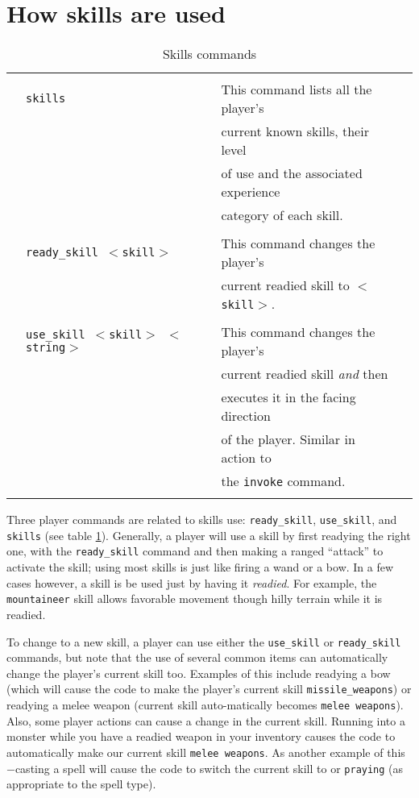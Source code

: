 \section{How skills are used}
 
\begin{table}
\small
\caption{Skills commands}\label{tab:skill_cmd}
\vskip 12pt
\begin{center}
\begin{tabular}{|cllc|} \hline 
 & & & \\
 & {\tt skills} & 	This command lists all the player's & \\ 
 &		& current known skills, their level & \\ 
 &		& of use and the associated experience & \\ 
 &		& category of each skill. & \\ 
 & & & \\ 
 & {\tt ready\_skill $<$skill$>$} 	& This command changes the player's & \\ 
  &				& current readied skill to {\tt $<$skill$>$}. &  \\ 
 & & & \\
 & {\tt use\_skill $<$skill$>$ $<$string$>$}  & This command changes the player's & \\ 
 &				& current readied skill {\em and} then & \\ 
  & 				& executes it in the facing direction & \\ 
 &				& of the player. Similar in action to & \\ 
 &				& the {\tt invoke} command. & \\ 
 & & & \\ \hline 
\end{tabular}
\end{center}
\end{table}
 
Three player commands are related to skills use: {\tt ready\_skill}, 
{\tt use\_skill}, and {\tt skills} (see table \ref{tab:skill_cmd}). 
Generally, a player will use a skill by first readying the right one,
with the {\tt ready\_skill} command and then making a ranged ``attack'' to
activate the skill; using most skills is just like firing a wand or a
bow.  In a few cases however, a skill is be used just by having it
{\em readied}. For example, the {\tt mountaineer} skill allows
favorable movement though hilly terrain while it is readied.
 
To change to a new skill, a player can use either the
{\tt use\_skill} or {\tt ready\_skill} commands, but note that the use of
several common items can automatically change the player's current
skill too. Examples of this include readying a bow (which will cause the
code to make the player's current skill {\tt missile\_weapons}) or readying
a melee weapon (current skill auto-matically becomes {\tt melee weapons}).
Also, some player actions can cause a change in the current skill.
Running into a monster while you have a readied weapon in your inventory
causes the code to automatically make our current skill {\tt melee weapons}.
As another example of this$-$casting a spell will cause the code to
switch the current skill to {\tt \spellcasting} or {\tt praying} (as appropriate
to the spell type).
 
